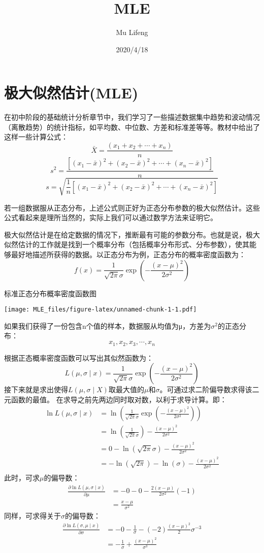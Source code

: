 \documentclass[
]{article}
\title{MLE}
\author{Mu Lifeng}
\date{2020/4/18}
\begin{document}
\maketitle

\section{极大似然估计(MLE)}\label{ux6781ux5927ux4f3cux7136ux4f30ux8ba1mle}

在初中阶段的基础统计分析章节中，我们学习了一些描述数据集中趋势和波动情况（离散趋势）的统计指标，如平均数、中位数、方差和标准差等等。教材中给出了这样一些计算公式：
\[\bar{X} = \frac{\left(x_1+ x_2 + \cdots + x_n\right)}{n}\]
\[s^2 = \frac{[(x_1-\bar{x})^2+(x_2-\bar{x})^2+\cdots+(x_n-\bar{x})^2]}{n}\]
\[s = \sqrt{\frac{1}{n}[(x_1-\bar{x})^2 + (x_2-\bar{x})^2 + \cdots + (x_n-\bar{x})^2]}\]

若一组数据服从正态分布，上述公式则正好为正态分布参数的极大似然估计。这些公式看起来是理所当然的，实际上我们可以通过数学方法来证明它。

极大似然估计是在给定数据的情况下，推断最有可能的参数分布。也就是说，极大似然估计的工作就是找到一个概率分布（包括概率分布形式、分布参数），使其能够最好地描述所获得的数据。以正态分布为例，正态分布的概率密度函数为：
\[f(x)=\frac{1}{\sqrt{2\pi}\sigma}\exp(-\frac{(x-\mu)^2}{2\sigma^2})\]

标准正态分布概率密度函数图

\texttt{[image: MLE\_files/figure-latex/unnamed-chunk-1-1.pdf]}

如果我们获得了一份包含n个值的样本，数据服从均值为μ，方差为\(σ^2\)的正态分布：
\[x_1, x_2, x_3, \cdots, x_n\]

根据正态概率密度函数可以写出其似然函数为：
\[L(\mu,\sigma \mid x)=\frac{1}{\sqrt{2\pi}\sigma}\exp(-\frac{(x-\mu)^2}{2\sigma^2})\]
接下来就是求出使得\(L(\mu,\sigma \mid X)\)取最大值的\(\mu\)和\(\sigma\)。可通过求二阶偏导数求得该二元函数的最值。
在求导之前先两边同时取对数，以利于求导计算。即： \[
\begin{align}
\ln L(\mu,\sigma \mid x)&=\ln (\frac{1}{\sqrt{2\pi}\sigma}\exp(-\frac{(x-\mu)^2}{2\sigma^2})) \\
&= \ln(\frac{1}{\sqrt{2\pi}\sigma}) -\frac{(x-\mu)^2}{2\sigma^2} \\
&=  0-\ln (\sqrt{2\pi}\sigma)-\frac{(x-\mu)^2}{2\sigma^2}\\
&= -\ln(\sqrt{2\pi}) - \ln (\sigma) - \frac{(x-\mu)^2}{2\sigma^2} \\
\end{align}
\] 此时，可求\(\mu\)的偏导数： \[
\begin{align}
\frac{\partial{\ln L(\mu,\sigma \mid x)}}{\partial{\mu}} &= -0-0-\frac{2(x-\mu)}{2\sigma^2}(-1)\\
&= \frac{x-\mu}{\sigma^2}
\end{align}
\] 同样，可求得关于\(\sigma\)的偏导数： \[
\begin{align}
\frac{\partial{\ln L(\sigma,\mu \mid x)}}{\partial{\sigma}} &=
-0-\frac{1}{\sigma}-(-2)\frac{(x-\mu)^2}{2}\sigma^{-3} \\ 
&= -\frac{1}{\sigma}+\frac{(x-\mu)^2}{\sigma^3} \\
\end{align}
\]
\end{document}

